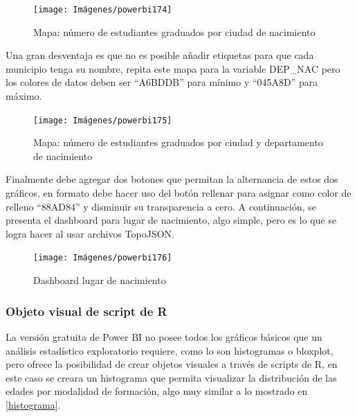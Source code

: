 \documentclass[
]{book}
\begin{document}
\begin{figure}

{\centering \texttt{[image: Imágenes/powerbi174]} 

}

\caption{Mapa: número de estudiantes graduados por ciudad de nacimiento}\label{fig:paso10mapadeformas-fig}
\end{figure}

Una gran desventaja es que no es posible añadir etiquetas para que cada municipio tenga su nombre, repita este mapa para la variable DEP\_NAC pero los colores de datos deben ser ``A6BDDB'' para mínimo y ``045A8D'' para máximo.

\begin{figure}

{\centering \texttt{[image: Imágenes/powerbi175]} 

}

\caption{Mapa: número de estudiantes graduados por ciudad y departamento de nacimiento}\label{fig:paso11mapadeformas-fig}
\end{figure}

Finalmente debe agregar dos botones que permitan la alternancia de estos dos gráficos, en formato debe hacer uso del botón rellenar para asignar como color de relleno ``88AD84'' y disminuir su transparencia a cero. A continuación, se presenta el dashboard para lugar de nacimiento, algo simple, pero es lo que se logra hacer al usar archivos TopoJSON.

\begin{figure}

{\centering \texttt{[image: Imágenes/powerbi176]} 

}

\caption{Dashboard lugar de nacimiento}\label{fig:dashboardlugarnacimeinto-fig}
\end{figure}

\hypertarget{objeto-visual-de-script-de-r}{%
\subsubsection{Objeto visual de script de R}\label{objeto-visual-de-script-de-r}}

La versión gratuita de Power BI no posee todos los gráficos básicos que un análisis estadístico exploratorio requiere, como lo son histogramas o bloxplot, pero ofrece la posibilidad de crear objetos visuales a través de scripts de R, en este caso se creara un histograma que permita visualizar la distribución de las edades por modalidad de formación, algo muy similar a lo mostrado en \ref{histograma}.
\end{document}

